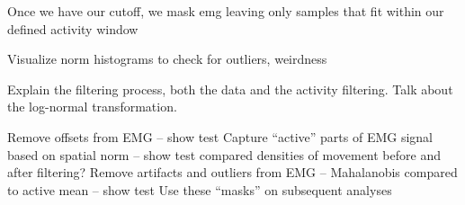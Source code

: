 \documentclass[../main.tex]{subfiles}
\begin{document}
Once we have our cutoff, we mask emg leaving only samples that fit within our defined activity window

Visualize norm histograms to check for outliers, weirdness

Explain the filtering process, both the data and the activity filtering. Talk about the log-normal transformation.

Remove offsets from EMG – show test
Capture “active” parts of EMG signal based on spatial norm – show test compared densities of movement before and after filtering?
Remove artifacts and outliers from EMG – Mahalanobis compared to active mean – show test
Use these “masks” on subsequent analyses






\end{document}
